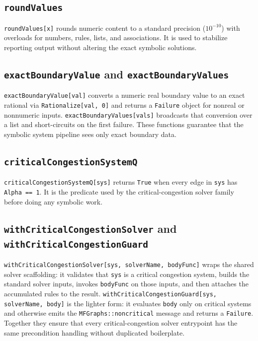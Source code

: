 \documentclass[11pt]{article}
\begin{document}
\subsection*{\texttt{roundValues}}

\texttt{roundValues[x]} rounds numeric content to a standard precision (\(10^{-10}\)) with overloads for numbers, rules, lists, and associations. It is used to stabilize reporting output without altering the exact symbolic solutions.

\subsection*{\texttt{exactBoundaryValue} and \texttt{exactBoundaryValues}}

\texttt{exactBoundaryValue[val]} converts a numeric real boundary value to an exact rational via \texttt{Rationalize[val, 0]} and returns a \texttt{Failure} object for nonreal or nonnumeric inputs. \texttt{exactBoundaryValues[vals]} broadcasts that conversion over a list and short-circuits on the first failure. These functions guarantee that the symbolic system pipeline sees only exact boundary data.

\subsection*{\texttt{criticalCongestionSystemQ}}

\texttt{criticalCongestionSystemQ[sys]} returns \texttt{True} when every edge in \texttt{sys} has \texttt{Alpha == 1}. It is the predicate used by the critical-congestion solver family before doing any symbolic work.

\subsection*{\texttt{withCriticalCongestionSolver} and \texttt{withCriticalCongestionGuard}}

\texttt{withCriticalCongestionSolver[sys, solverName, bodyFunc]} wraps the shared solver scaffolding: it validates that \texttt{sys} is a critical congestion system, builds the standard solver inputs, invokes \texttt{bodyFunc} on those inputs, and then attaches the accumulated rules to the result. \texttt{withCriticalCongestionGuard[sys, solverName, body]} is the lighter form: it evaluates \texttt{body} only on critical systems and otherwise emits the \texttt{MFGraphs::noncritical} message and returns a \texttt{Failure}. Together they ensure that every critical-congestion solver entrypoint has the same precondition handling without duplicated boilerplate.
\end{document}
